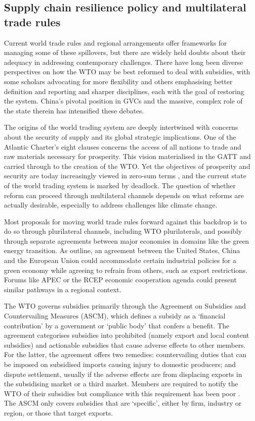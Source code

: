 \documentclass{article}
\begin{document}
\subsection{Supply chain resilience policy and multilateral trade rules}

Current world trade rules and regional arrangements offer frameworks for managing some of these spillovers, but there are widely held doubts about their adequacy in addressing contemporary challenges. There have long been diverse perspectives on how the WTO may be best reformed to deal with subsidies, with some scholars advocating for more flexibility and others emphasising better definition and reporting and sharper disciplines, each with the goal of restoring the system. China's pivotal position in GVCs and the massive, complex role of the state therein has intensified these debates.

The origins of the world trading system are deeply intertwined with concerns about the security of supply and its global strategic implications. One of the Atlantic Charter's eight clauses concerns the access of all nations to trade and raw materials necessary for prosperity. This vision materialised in the GATT and carried through to the creation of the WTO. Yet the objectives of prosperity and security are today increasingly viewed in zero-sum terms \parencite{armstrong_economics_2023}, and the current state of the world trading system is marked by deadlock. The question of whether reform can proceed through multilateral channels depends on what reforms are actually desirable, especially to address challenges like climate change.

Most proposals for moving world trade rules forward against this backdrop is to do so through plurilateral channels, including WTO plurilaterals, and possibly through separate agreements between major economies in domains like the green energy transition. As \textcite{bown_how_2023} outline, an agreement between the United States, China and the European Union could accommodate certain industrial policies for a green economy while agreeing to refrain from others, such as export restrictions. Forums like APEC or the RCEP economic cooperation agenda could present similar pathways in a regional context.

The WTO governs subsidies primarily through the Agreement on Subsidies and Countervailing Measures (ASCM), which defines a subsidy as a `financial contribution' by a government or `public body' that confers a benefit. The agreement categorises subsidies into prohibited (namely export and local content subsidies) and actionable subsidies that cause adverse effects to other members. For the latter, the agreement offers two remedies: countervailing duties that can be imposed on subsidised imports causing injury to domestic producers; and dispute settlement, usually if the adverse effects are from displacing exports in the subsidising market or a third market. Members are required to notify the WTO of their subsidies but compliance with this requirement has been poor \parencite[570]{bown_wtoing_2019}. The ASCM only covers subsidies that are `specific', either by firm, industry or region, or those that target exports.
\end{document}
